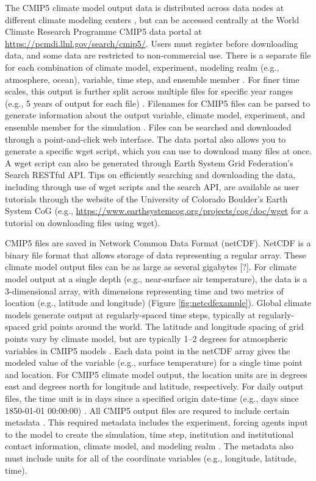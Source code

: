 The CMIP5 climate model output data is distributed across data nodes at
different climate modeling centers \citep{taylor2012overview}, but can
be accessed centrally at the World Climate Research Programme CMIP5 data
portal at \url{https://pcmdi.llnl.gov/search/cmip5/}. Users must
register before downloading data, and some data are restricted to
non-commercial use. There is a separate file for each combination of
climate model, experiment, modeling realm (e.g., atmosphere, ocean),
variable, time step, and ensemble member
\citep{taylor2012overview, taylor2010cmip5}. For finer time scales, this
output is further split across multiple files for specific year ranges
(e.g., 5 years of output for each file) \citep{taylor2010cmip5}.
Filenames for CMIP5 files can be parsed to generate information about
the output variable, climate model, experiment, and ensemble member for
the simulation \citep{taylor2010cmip5}. Files can be searched and
downloaded through a point-and-click web interface. The data portal also
allows you to generate a specific wget script, which you can use to
download many files at once. A wget script can also be generated through
Earth System Grid Federation's Search RESTful API. Tips on efficiently
searching and downloading the data, including through use of wget
scripts and the search API, are available as user tutorials through the
website of the University of Colorado Boulder's Earth System CoG (e.g.,
\url{https://www.earthsystemcog.org/projects/cog/doc/wget} for a
tutorial on downloading files using wget).

CMIP5 files are saved in Network Common Data Format (netCDF). NetCDF is
a binary file format that allows storage of data representing a regular
array. These climate model output files can be as large as several
gigabytes {[}?{]}. For climate model output at a single depth (e.g.,
near-surface air temperature), the data is a 3-dimensional array, with
dimensions representing time and two metrics of location (e.g., latitude
and longitude) (Figure \ref{fig:netcdfexample}). Global climate models
generate output at regularly-spaced time steps, typically at
regularly-spaced grid points around the world. The latitude and
longitude spacing of grid points vary by climate model, but are
typically 1--2 degrees for atmospheric variables in CMIP5 models
\citep{IPCCch9}. Each data point in the netCDF array gives the modeled
value of the variable (e.g., surface temperature) for a single time
point and location. For CMIP5 climate model output, the location units
are in degrees east and degrees north for longitude and latitude,
respectively. For daily output files, the time unit is in days since a
specified origin date-time (e.g., days since 1850-01-01 00:00:00)
\citep{taylor2010cmip5}. All CMIP5 output files are requred to include
certain metadata \citep{taylor2010cmip5}. This required metadata
includes the experiment, forcing agents input to the model to create the
simulation, time step, institution and institutional contact
information, climate model, and modeling realm \citep{taylor2010cmip5}.
The metadata also must include units for all of the coordinate variables
(e.g., longitude, latitude, time).

